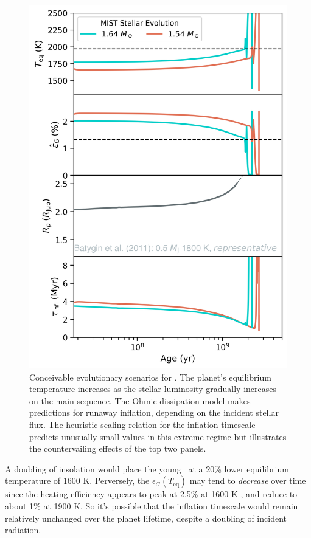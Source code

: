 \documentclass[twocolumn]{aastex631}
\newcommand{\hatpb}{\object{HAT-P-67 b}}
\begin{document}
\begin{figure}
    \includegraphics[width=\linewidth]{figures/reinflation_MIST.png}
    \caption{Conceivable evolutionary scenarios for \hatpb.  The planet's equilibrium temperature increases as the stellar luminosity gradually increases on the main sequence.  The Ohmic dissipation model makes predictions for runaway inflation, depending on the incident stellar flux.  The heuristic scaling relation for the inflation timescale predicts unusually small values in this extreme regime but illustrates the countervailing effects of the top two panels.}
    \label{fig:OhmicInflate}
\end{figure}

A doubling of insolation would place the young \hatpb~at a 20\% lower equilibrium temperature of 1600 K.  Perversely, the $\epsilon_G(T_\mathrm{eq})$ may tend to \emph{decrease} over time since the heating efficiency appears to peak at 2.5\% at 1600 K \citep{2018AJ....155..214T}, and reduce to about 1\% at 1900 K.  So it's possible that the inflation timescale would remain relatively unchanged over the planet lifetime, despite a doubling of incident radiation.
\end{document}
